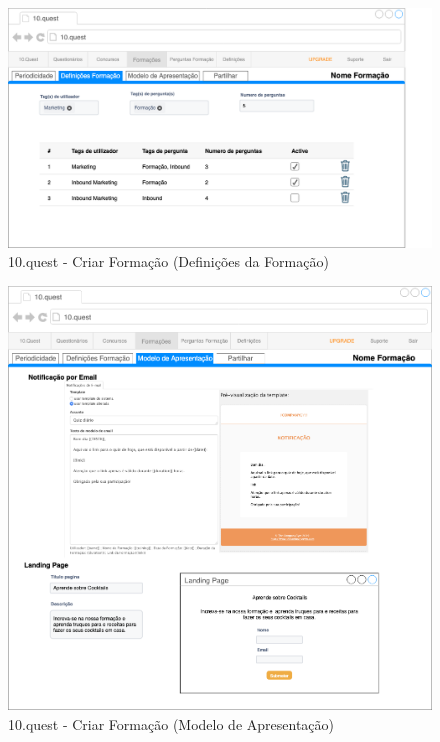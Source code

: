 \begin{figure}[ht!]
	\begin{center}
		\includegraphics[width=1\textwidth]{img/prototipos/10.png}
		\caption{10.quest - Criar Formação (Definições da Formação)}
		\label{10q-}
	\end{center}
\end{figure}

\begin{figure}[ht!]
	\begin{center}
		\includegraphics[width=1\textwidth]{img/prototipos/11.png}
		\caption{10.quest - Criar Formação (Modelo de Apresentação)}
		\label{10q-}
	\end{center}
\end{figure}

